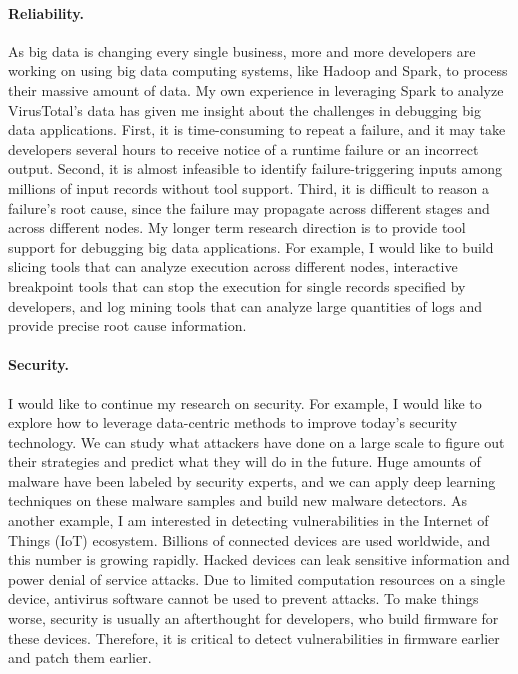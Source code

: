 \documentclass[10pt]{article}
\begin{document}
\vspace{-.1in}
\paragraph{Reliability.} 
As big data is changing every single business, 
more and more developers are working on using big data computing systems, 
like Hadoop and Spark, to process their massive amount of data. 
My own experience in leveraging Spark to analyze VirusTotal's data 
has given me insight about the challenges in debugging big data applications. 
First, it is time-consuming to repeat a failure, and it may take developers several hours to receive notice of a runtime failure or an incorrect output.
Second, it is almost infeasible to identify failure-triggering inputs among millions of input records without tool support. 
Third, it is difficult to reason a failure's root cause, since the failure may propagate across different stages and across different nodes. 
My longer term research direction is to provide tool support for debugging big data applications.
For example, I would like to build slicing tools that can analyze execution across different nodes, 
interactive breakpoint tools that can stop the execution for single records specified by developers, 
and log mining tools that can analyze large quantities of logs and provide precise root cause information. 



\vspace{-.1in}
\paragraph{Security.} 
I would like to continue my research on security. 
For example, I would like to explore how to leverage data-centric methods to improve today's security technology. 
We can study what attackers have done on a large scale to figure out their strategies and predict what they will do in the future. 
Huge amounts of malware have been labeled by security experts, and we can apply deep learning techniques on these malware samples and build new malware detectors. 
As another example, I am interested in detecting vulnerabilities in the Internet of Things (IoT) ecosystem. 
Billions of connected devices are used worldwide, 
and this number is growing rapidly. 
Hacked devices can leak sensitive information and power denial of service attacks. 
Due to limited computation resources on a single device, 
antivirus software cannot be used to prevent attacks. 
To make things worse, security is usually an afterthought for developers, who build firmware for these devices. 
Therefore, it is critical to detect vulnerabilities in firmware earlier and patch them earlier. 

\newpage


\end{document}
